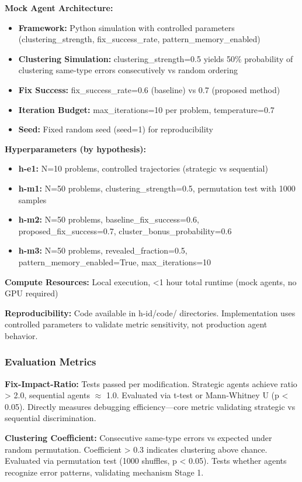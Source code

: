 \textbf{Mock Agent Architecture:}
\begin{itemize}
\item \textbf{Framework:} Python simulation with controlled parameters (clustering\_strength, fix\_success\_rate, pattern\_memory\_enabled)
\item \textbf{Clustering Simulation:} clustering\_strength=0.5 yields 50\% probability of clustering same-type errors consecutively vs random ordering
\item \textbf{Fix Success:} fix\_success\_rate=0.6 (baseline) vs 0.7 (proposed method)
\item \textbf{Iteration Budget:} max\_iterations=10 per problem, temperature=0.7
\item \textbf{Seed:} Fixed random seed (seed=1) for reproducibility
\end{itemize}

\textbf{Hyperparameters (by hypothesis):}
\begin{itemize}
\item \textbf{h-e1:} N=10 problems, controlled trajectories (strategic vs sequential)
\item \textbf{h-m1:} N=50 problems, clustering\_strength=0.5, permutation test with 1000 samples
\item \textbf{h-m2:} N=50 problems, baseline\_fix\_success=0.6, proposed\_fix\_success=0.7, cluster\_bonus\_probability=0.6
\item \textbf{h-m3:} N=50 problems, revealed\_fraction=0.5, pattern\_memory\_enabled=True, max\_iterations=10
\end{itemize}

\textbf{Compute Resources:} Local execution, <1 hour total runtime (mock agents, no GPU required)

\textbf{Reproducibility:} Code available in h-{id}/code/ directories. Implementation uses controlled parameters to validate metric sensitivity, not production agent behavior.

\subsubsection{Evaluation Metrics}

\textbf{Fix-Impact-Ratio:} Tests passed per modification. Strategic agents achieve ratio > 2.0, sequential agents $\approx$ 1.0. Evaluated via t-test or Mann-Whitney U (p < 0.05). Directly measures debugging efficiency---core metric validating strategic vs sequential discrimination.

\textbf{Clustering Coefficient:} Consecutive same-type errors vs expected under random permutation. Coefficient > 0.3 indicates clustering above chance. Evaluated via permutation test (1000 shuffles, p < 0.05). Tests whether agents recognize error patterns, validating mechanism Stage 1.

